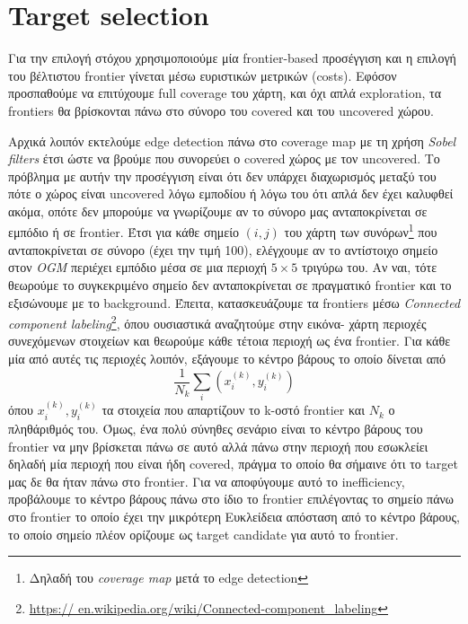 \section*{Target selection}
Για την επιλογή στόχου χρησιμοποιούμε μία frontier-based προσέγγιση και η επιλογή του βέλτιστου 
frontier γίνεται μέσω ευριστικών μετρικών (costs). Εφόσον προσπαθούμε να επιτύχουμε full coverage 
του χάρτη, και όχι απλά exploration, τα frontiers θα βρίσκονται πάνω στο σύνορο του covered και του 
uncovered χώρου.

Αρχικά λοιπόν εκτελούμε edge detection πάνω στο coverage map με τη χρήση \emph{Sobel filters} έτσι 
ώστε να βρούμε που συνορεύει ο covered χώρος με τον uncovered. Το πρόβλημα με αυτήν την 
προσέγγιση είναι ότι δεν υπάρχει διαχωρισμός μεταξύ του πότε ο χώρος είναι uncovered λόγω 
εμποδίου ή λόγω του ότι απλά δεν έχει καλυφθεί ακόμα, οπότε δεν μπορούμε να γνωρίζουμε αν το 
σύνορο μας ανταποκρίνεται σε εμπόδιο ή σε frontier. Έτσι για κάθε σημείο $(i, j)$ του χάρτη των 
συνόρων\footnote{Δηλαδή του \emph{coverage map} μετά το edge detection} που ανταποκρίνεται σε 
σύνορο (έχει την τιμή 100), ελέγχουμε αν το αντίστοιχο σημείο στον \emph{OGM} περιέχει εμπόδιο 
μέσα σε μια περιοχή $5\times5$ τριγύρω του. Αν ναι, τότε θεωρούμε το συγκεκριμένο σημείο δεν 
ανταποκρίνεται σε πραγματικό frontier και το εξισώνουμε με το background. Έπειτα, 
κατασκευάζουμε τα frontiers μέσω \emph{Connected component labeling}\footnote{\url{https://
en.wikipedia.org/wiki/Connected-component_labeling}}, όπου ουσιαστικά αναζητούμε στην εικόνα-
χάρτη περιοχές συνεχόμενων στοιχείων και θεωρούμε κάθε τέτοια περιοχή ως ένα frontier. Για κάθε 
μία από αυτές τις περιοχές λοιπόν, εξάγουμε το κέντρο βάρους το οποίο δίνεται από
$$\frac{1}{N_k} \sum_i \left( x_i^{(k)}, y_i^{(k)} \right)$$
όπου $x_i^{(k)}, y_i^{(k)}$ τα στοιχεία που απαρτίζουν το k-οστό frontier και $N_k$ ο πληθάριθμός 
του. Όμως, ένα πολύ σύνηθες σενάριο είναι το κέντρο βάρους του frontier να μην βρίσκεται πάνω σε 
αυτό αλλά πάνω στην περιοχή που εσωκλείει δηλαδή μία περιοχή που είναι ήδη covered, πράγμα το οποίο 
θα σήμαινε ότι το target μας δε θα ήταν πάνω στο frontier. Για να αποφύγουμε αυτό το inefficiency, 
προβάλουμε το κέντρο βάρους πάνω στο ίδιο το frontier επιλέγοντας το σημείο πάνω στο frontier το 
οποίο έχει την μικρότερη Ευκλείδεια απόσταση από το κέντρο βάρους, το οποίο σημείο πλέον ορίζουμε 
ως target candidate για αυτό το frontier.

